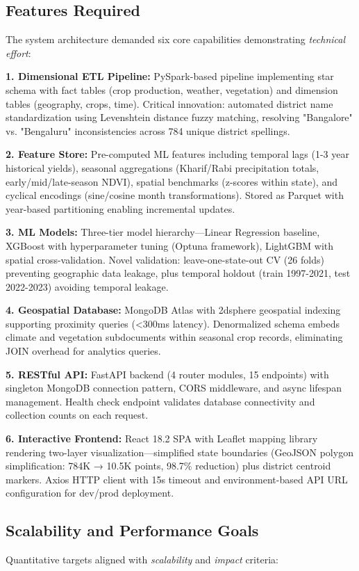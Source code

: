 \documentclass[10pt,a4paper]{article}
\begin{document}
\subsection{Features Required}
The system architecture demanded six core capabilities demonstrating \textit{technical effort}:

\textbf{1. Dimensional ETL Pipeline:} PySpark-based pipeline implementing star schema with fact tables (crop production, weather, vegetation) and dimension tables (geography, crops, time). Critical innovation: automated district name standardization using Levenshtein distance fuzzy matching, resolving "Bangalore" vs. "Bengaluru" inconsistencies across 784 unique district spellings.

\textbf{2. Feature Store:} Pre-computed ML features including temporal lags (1-3 year historical yields), seasonal aggregations (Kharif/Rabi precipitation totals, early/mid/late-season NDVI), spatial benchmarks (z-scores within state), and cyclical encodings (sine/cosine month transformations). Stored as Parquet with year-based partitioning enabling incremental updates.

\textbf{3. ML Models:} Three-tier model hierarchy—Linear Regression baseline, XGBoost with hyperparameter tuning (Optuna framework), LightGBM with spatial cross-validation. Novel validation: leave-one-state-out CV (26 folds) preventing geographic data leakage, plus temporal holdout (train 1997-2021, test 2022-2023) avoiding temporal leakage.

\textbf{4. Geospatial Database:} MongoDB Atlas with 2dsphere geospatial indexing supporting proximity queries (<300ms latency). Denormalized schema embeds climate and vegetation subdocuments within seasonal crop records, eliminating JOIN overhead for analytics queries.

\textbf{5. RESTful API:} FastAPI backend (4 router modules, 15 endpoints) with singleton MongoDB connection pattern, CORS middleware, and async lifespan management. Health check endpoint validates database connectivity and collection counts on each request.

\textbf{6. Interactive Frontend:} React 18.2 SPA with Leaflet mapping library rendering two-layer visualization—simplified state boundaries (GeoJSON polygon simplification: 784K → 10.5K points, 98.7\% reduction) plus district centroid markers. Axios HTTP client with 15s timeout and environment-based API URL configuration for dev/prod deployment.

\subsection{Scalability and Performance Goals}
Quantitative targets aligned with \textit{scalability} and \textit{impact} criteria:
\end{document}

